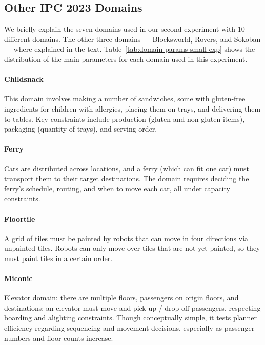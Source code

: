 
\subsection{Other IPC 2023 Domains}
\label{sec:domains}

We briefly explain the seven domains used in our second experiment with 10
different domains. The other three domains --- Blocksworld, Rovers, and Sokoban
--- where explained in the text. Table~\ref{tab:domain-params-small-exp} shows
the distribution of the main parameters for each domain used in this experiment.

\paragraph{Childsnack}

This domain involves making a number of sandwiches, some with gluten‐free
ingredients for children with allergies, placing them on trays, and delivering
them to tables. Key constraints include production (gluten and non‐gluten
items), packaging (quantity of trays), and serving order.

\paragraph{Ferry}

Cars are distributed across locations, and a ferry (which can fit one car) must
transport them to their target destinations. The domain requires deciding the
ferry’s schedule, routing, and when to move each car, all under capacity
constraints.

\paragraph{Floortile}

A grid of tiles must be painted by robots that can move in four directions via
unpainted tiles. Robots can only move over tiles that are not yet painted, so
they must paint tiles in a certain order.

\paragraph{Miconic}

Elevator domain: there are multiple floors, passengers on origin floors, and
destinations; an elevator must move and pick up / drop off passengers,
respecting boarding and alighting constraints. Though conceptually simple, it
tests planner efficiency regarding sequencing and movement decisions, especially
as passenger numbers and floor counts increase.

